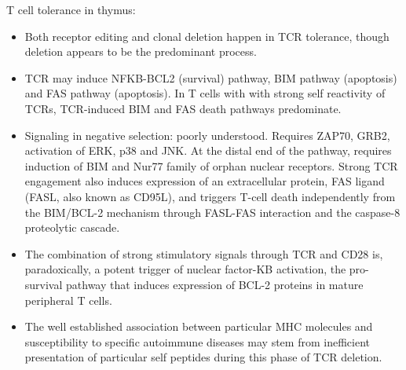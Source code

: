 \documentclass{report}
\begin{document}
T cell tolerance in thymus: 
\begin{itemize}
	\item Both receptor editing and clonal deletion happen in TCR tolerance, though deletion appears to be the predominant process.
	
	\item TCR may induce NFKB-BCL2 (survival) pathway, BIM pathway (apoptosis) and FAS pathway (apoptosis). In T cells with with strong self reactivity of TCRs, TCR-induced BIM and FAS death pathways predominate. 
	
	\item Signaling in negative selection: poorly understood. Requires ZAP70, GRB2, activation of ERK, p38 and JNK. At the distal end of the pathway, requires induction of BIM and Nur77 family of orphan nuclear receptors. Strong TCR engagement also induces expression of an extracellular protein, FAS ligand (FASL, also known as CD95L), and triggers T-cell death independently from the BIM/BCL-2 mechanism through FASL-FAS interaction and the caspase-8 proteolytic cascade. 
	
	\item The combination of strong stimulatory signals through TCR and CD28 is, paradoxically, a potent trigger of nuclear factor-KB activation, the pro-survival pathway that induces expression of BCL-2 proteins in mature peripheral T cells. 
	
	\item The well established association between particular MHC molecules and susceptibility to specific autoimmune diseases may stem from inefficient presentation of particular self peptides during this phase of TCR deletion. 
\end{itemize}
\end{document}
